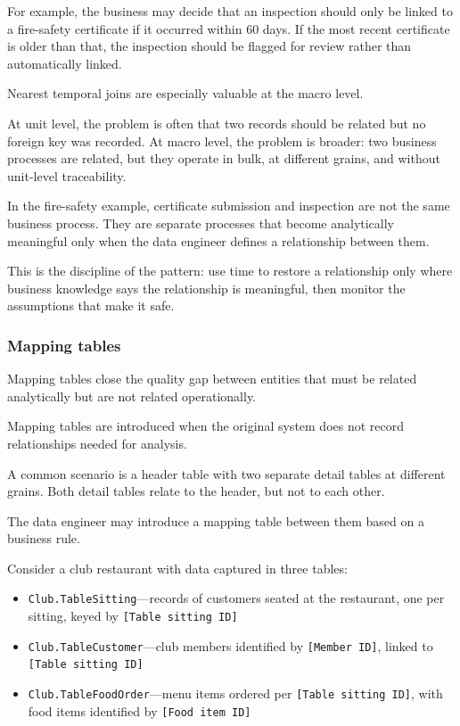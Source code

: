\documentclass[10pt,openany,10pt]{book}
\providecommand{\tightlist}{%
  \setlength{\itemsep}{0pt}\setlength{\parskip}{0pt}}
\begin{document}
For example, the business may decide that an inspection should only be
linked to a fire-safety certificate if it occurred within 60 days. If
the most recent certificate is older than that, the inspection should be
flagged for review rather than automatically linked.

Nearest temporal joins are especially valuable at the macro level.

At unit level, the problem is often that two records should be related
but no foreign key was recorded. At macro level, the problem is broader:
two business processes are related, but they operate in bulk, at
different grains, and without unit-level traceability.

In the fire-safety example, certificate submission and inspection are
not the same business process. They are separate processes that become
analytically meaningful only when the data engineer defines a
relationship between them.

This is the discipline of the pattern: use time to restore a
relationship only where business knowledge says the relationship is
meaningful, then monitor the assumptions that make it safe.

\subsubsection{Mapping tables}\label{mapping-tables}

Mapping tables close the quality gap between entities that must be
related analytically but are not related operationally.

Mapping tables are introduced when the original system does not record
relationships needed for analysis.

A common scenario is a header table with two separate detail tables at
different grains. Both detail tables relate to the header, but not to
each other.

The data engineer may introduce a mapping table between them based on a
business rule.

Consider a club restaurant with data captured in three tables:

\begin{itemize}
\tightlist
\item
  \texttt{Club.TableSitting}---records of customers seated at the
  restaurant, one per sitting, keyed by
  \texttt{{[}Table\ sitting\ ID{]}}
\item
  \texttt{Club.TableCustomer}---club members identified by
  \texttt{{[}Member\ ID{]}}, linked to \texttt{{[}Table\ sitting\ ID{]}}
\item
  \texttt{Club.TableFoodOrder}---menu items ordered per
  \texttt{{[}Table\ sitting\ ID{]}}, with food items identified by
  \texttt{{[}Food\ item\ ID{]}}
\end{itemize}
\end{document}
